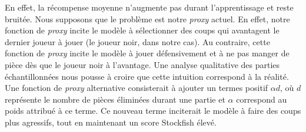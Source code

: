 \documentclass[11pt]{article}
\begin{document}
En effet, la récompense moyenne n'augmente pas durant l'apprentissage
et reste bruitée. Nous supposons que le problème est notre
\textit{proxy} actuel. En effet, notre fonction de \textit{proxy}
incite le modèle à sélectionner des coups qui avantagent le dernier
joueur à jouer (le joueur noir, dans notre cas). Au contraire, cette
fonction de \textit{proxy} incite le modèle à jouer défensivement et à
ne pas manger de pièce dès que le joueur noir à l'avantage. Une
analyse qualitative des parties échantillonnées nous pousse à croire
que cette intuition correspond à la réalité. Une fonction de
\textit{proxy} alternative consisterait à ajouter un termes positif
$\alpha d$, où $d$ représente le nombre de pièces éliminées durant une
partie et $\alpha$ correspond au poids attribué à ce terme. Ce nouveau
terme inciterait le modèle à faire des coups plus agressifs, tout en
maintenant un score Stockfish élevé.




 

\appendix
\end{document}
